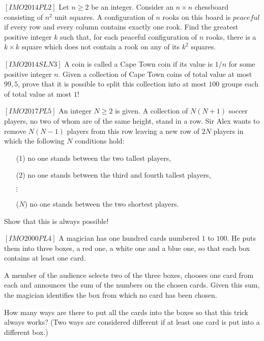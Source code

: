 

%

\renewcommand{\theenumi}{\alph{enumi}}



\noindent
 
\filbreak

\begin{problem}
$[IMO2014PL2]$
Let $n\ge2$ be an integer. Consider an $n\times n$ chessboard consisting of $n^2$ unit squares. A configuration of $n$ rooks on this board is $\textit{peaceful}$ if every row and every column contains exactly one rook. Find the greatest positive integer $k$ such that, for each peaceful configuration of $n$ rooks, there is a $k\times k$ square which does not contain a rook on any of its $k^2$ squares.
\end{problem}


\begin{problem}
$[IMO2014SLN3]$
A coin is called a Cape Town coin if its value is $1/n$ for some positive integer $n$. Given a collection of Cape Town coins of total value at most $99,5$, prove that it is possible to split
this collection into at most $100$ groups each of total value at most $1$!
\end{problem}

\begin{problem}
$[IMO2017PL5]$
An integer $N \geqslant 2$ is given. A collection of $N(N+1)$ soccer players, no two of whom are of the same height, stand in a row. Sir Alex wants to remove $N(N-1)$ players from this row leaving a new row of $2N$ players in which the following $N$ conditions hold:
\begin{itemize}
\item[(1)]
no one stands between the two tallest players,
\item[(2)]
no one stands between the third and fourth tallest players,
\item[$\vdots$]
\item[($N$)]
no one stands between the two shortest players.
\end{itemize}
Show that this is always possible!
\end{problem}

\begin{problem}
$[IMO2000PL4]$
A magician has one hundred cards numbered $1$ to $100$. He puts them into three boxes, a red one, a white one and a blue one, so that each box contains at least one card.

A member of the audience selects two of the three boxes, chooses one card from each and announces the sum of the numbers on the chosen cards. Given this sum, the magician identifies the box from which no card has been chosen.

How many ways are there to put all the cards into the boxes so that this trick always works? (Two ways are considered different if at least one card is put into a different box.)
\end{problem}

